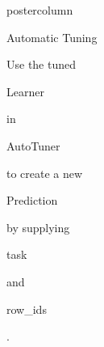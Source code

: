\documentclass{beamer}
\newcommand{\codeinline}[1]{\begin{codeboxinline}#1\end{codeboxinline}}
\begin{document}
\begin{frame}[fragile]{}
\begin{columns}
\begin{column}{.245\textwidth}
\begin{beamercolorbox}[center]{postercolumn}
\begin{minipage}{.98\textwidth}
{\begin{myblock}{Automatic Tuning}
\begin{codebox}
							\end{codebox}
							Use the tuned \codeinline{Learner} in \codeinline{AutoTuner} to create a new \codeinline{Prediction} by supplying \codeinline{task} and \codeinline{row\_ids}.
							\\
						\end{myblock}
						\vfill}
				\end{minipage}
			\end{beamercolorbox}
		\end{column}
	\end{columns}
\end{frame}
\end{document}
